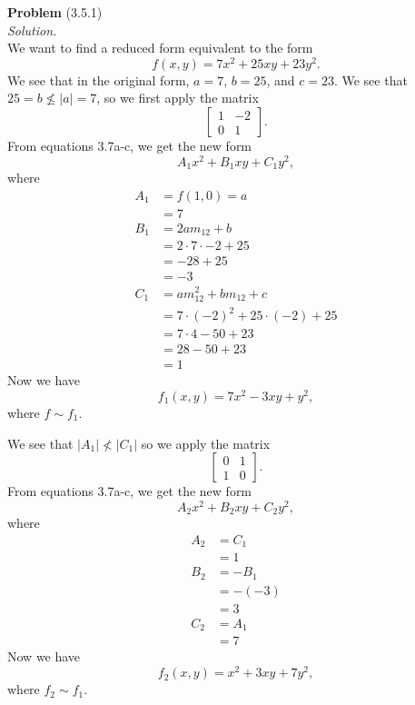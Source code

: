 \documentclass[12 pt]{amsart}
\begin{document}
\phantom{\quad} \vfill
\noindent
\textbf{Problem} (3.5.1) \\[4ex]
\emph{Solution.} \\[2ex]
  We want to find a reduced form equivalent to the form
  \[
    f(x,y) = 7x^2 + 25 xy + 23y^2.
  \]
  We see that in the original form, 
  $a = 7$, $b = 25$, and $c = 23$.
  We see that $25 = b \not \leq |a| = 7$, so 
  we first apply the matrix
  \[
    \begin{bmatrix} 1 & -2 \\ 0 & 1 \end{bmatrix}.
  \]
  From equations 3.7a-c, we get the new form
  \[
    A_1x^2 + B_1xy + C_1y^2,
  \]
  where 
  \begin{align*}
    A_1 &= f(1,0) = a  \\
      &= 7\\
    B_1 &= 2am_{12} + b \\
      &= 2\cdot 7 \cdot -2 + 25 \\
      &= -28 + 25 \\
      &= -3 \\
    C_1 &= am_{12}^2 + bm_{12} + c \\
      &= 7 \cdot (-2)^2 + 25 \cdot (-2) + 25 \\
      &= 7 \cdot 4 - 50 + 23 \\
      &= 28 - 50 + 23 \\
      &= 1
  \end{align*}
  Now we have 
  \[
    f_1(x,y) = 7x^2 - 3xy + y^2,
  \]
  where $f \sim f_1$.

  We see that $|A_1| \not< |C_1|$ so we apply the matrix
  \[
    \begin{bmatrix}0 & 1 \\ 1 & 0 \end{bmatrix}.
  \]
  From equations 3.7a-c, we get the new form
  \[
    A_2x^2 + B_2xy + C_2y^2,
  \]
  where 
  \begin{align*}
    A_2 &= C_1 \\
      &= 1\\
    B_2 &= -B_1 \\
      &= -(-3) \\
      &= 3 \\
    C_2 &= A_1 \\
      &= 7
  \end{align*}
  Now we have 
  \[
    f_2(x,y) = x^2 + 3xy + 7y^2,
  \]
  where $f_2 \sim f_1$.
\end{document}
